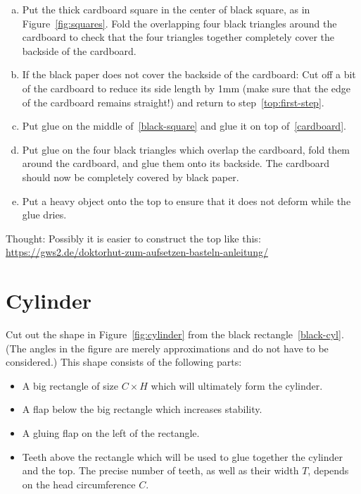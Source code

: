 \documentclass[a4paper,10pt]{article}
\begin{document}
	\begin{enumerate}[(a)]
		\item\label{top:first-step} Put the thick cardboard square in the center of black square, as in Figure~\ref{fig:squares}. Fold the overlapping four black triangles around the cardboard to check that the four triangles together completely cover the backside of the cardboard.
		
		\item If the black paper does not cover the backside of the cardboard: Cut off a bit of the cardboard to reduce its side length by 1mm (make sure that the edge of the cardboard remains straight!) and return to step~\ref{top:first-step}.
		
		\item Put glue on the middle of~\ref{black-square} and glue it on top of~\ref{cardboard}.
		
		\item Put glue on the four black triangles which overlap the cardboard, fold them around the cardboard, and glue them onto its backside. The cardboard should now be completely covered by black paper.
		
		\item Put a heavy object onto the top to ensure that it does not deform while the glue dries.
	\end{enumerate}
	
	Thought: Possibly it is easier to construct the top like this: \\
	\url{https://gws2.de/doktorhut-zum-aufsetzen-basteln-anleitung/}
	
	\section*{Cylinder}
	
	Cut out the shape in Figure~\ref{fig:cylinder} from the black rectangle~\ref{black-cyl}. (The angles in the figure are merely approximations and do not have to be considered.) This shape consists of the following parts:
	\begin{itemize}
		\item A big rectangle of size $ C \times H $ which will ultimately form the cylinder.
		
		\item A flap below the big rectangle which increases stability.
		
		\item A gluing flap on the left of the rectangle.
		
		\item Teeth above the rectangle which will be used to glue together the cylinder and the top. The precise number of teeth, as well as their width $ T $, depends on the head circumference $ C $.
	\end{itemize}
	
\end{document}
